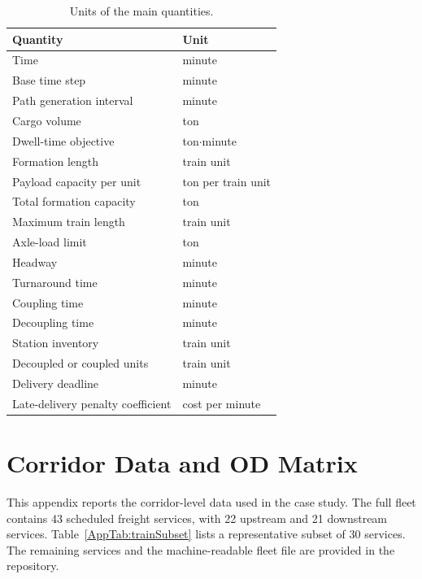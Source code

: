 \documentclass[11pt]{article}
\begin{document}
\begin{table}[!htbp]
\centering
\small
\caption{Units of the main quantities.}
\label{AppTab:units}
\begin{tabular}{ll}
\toprule
\textbf{Quantity} & \textbf{Unit} \\
\midrule
Time & minute \\
Base time step & minute \\
Path generation interval & minute \\
Cargo volume & ton \\
Dwell-time objective & ton$\cdot$minute \\
Formation length & train unit \\
Payload capacity per unit & ton per train unit \\
Total formation capacity & ton \\
Maximum train length & train unit \\
Axle-load limit & ton \\
Headway & minute \\
Turnaround time & minute \\
Coupling time & minute \\
Decoupling time & minute \\
Station inventory & train unit \\
Decoupled or coupled units & train unit \\
Delivery deadline & minute \\
Late-delivery penalty coefficient & cost per minute \\
\bottomrule
\end{tabular}
\end{table}


\clearpage

\section{Corridor Data and OD Matrix}
\label{App:CorridorData}

This appendix reports the corridor-level data used in the case study. The full fleet contains 43 scheduled freight services, with 22 upstream and 21 downstream services. Table~\ref{AppTab:trainSubset} lists a representative subset of 30 services. The remaining services and the machine-readable fleet file are provided in the repository.
\end{document}
